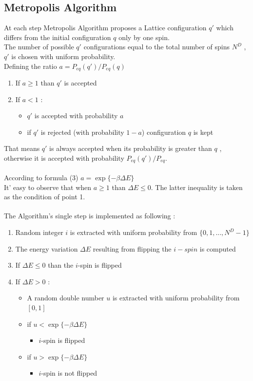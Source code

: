 \documentclass[11pt,a4paper]{article}
\begin{document}
\subsection{Metropolis Algorithm}

At each step Metropolis Algorithm proposes a Lattice configuration $q'$ which differs from the initial configuration $q$ only by one spin.\\ 
The number of possible $q'$ configurations equal to the total number of spins $N^D$ , $q'$ is chosen with uniform probability.
\\Defining the ratio $a = P_{eq}(q')/P_{eq}(q)$ 
\begin{enumerate}
	\item If $a \geq 1$ than $q'$ is accepted 
	\item If $a < 1$ :
		\begin{itemize}
			\item[] $q'$ is accepted with probability $a$
			\item[] if $q'$ is rejected (with probability $1-a$) configuration $q$ is kept
		\end{itemize}				 
\end{enumerate}
That means $q'$ is always accepted when its probability is greater than $q$ , otherwise it is accepted with 
probability $P_{eq}(q')/P_{eq}$.\\
\\
According to formula (3) $a = \exp \lbrace -\beta  \Delta E  \rbrace$ \\
It' easy to observe that when $a \geq 1$ than $ \Delta E \leq 0 $. The latter inequality is taken as the  condition of point 1.  
\\
\\
The Algorithm's single step is implemented as following :
	
\begin{enumerate}
	
	\item Random integer $i$ is extracted with uniform probability from $\{0,1,...,N^D -1\}$
	\item The energy variation $ \Delta E $ resulting from flipping the $i-spin$ is computed		
	\item If $\Delta E \leq 0 $ than the $i$-spin is flipped
	\item If $\Delta E > 0 $ :
		\begin{itemize}
			\item[]  A random double number $u$ is extracted with uniform probability from $[0,1]$
			\item[]	 if $u < \exp \lbrace -\beta  \Delta E  \rbrace $					
			\begin{itemize}
				\item[] $i$-spin is flipped 
			\end{itemize}				 	 
			\item[]	 if $u > \exp \lbrace -\beta  \Delta E  \rbrace $
			\begin{itemize}
				\item[] $i$-spin is not flipped 
			\end{itemize}					
		\end{itemize}				 
\end{enumerate}
\newpage
\end{document}
